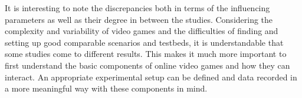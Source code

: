 It is interesting to note the discrepancies both in terms of the influencing parameters as well as their degree in between the studies. Considering the complexity and variability of video games and the difficulties of finding and setting up good comparable scenarios and testbeds, it is understandable that some studies come to different results. This makes it much more important to first understand the basic components of online video games and how they can interact. An appropriate experimental setup can be defined and data recorded in a more meaningful way with these components in mind.
















